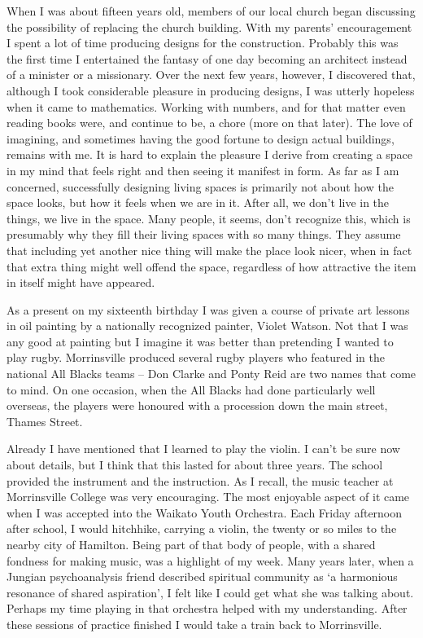 When I was about fifteen years old, members of our local church began
discussing the possibility of replacing the church building. With my
parents' encouragement I spent a lot of time producing designs for the
construction. Probably this was the first time I entertained the fantasy
of one day becoming an architect instead of a minister or a missionary.
Over the next few years, however, I discovered that, although I took
considerable pleasure in producing designs, I was utterly hopeless when
it came to mathematics. Working with numbers, and for that matter even
reading books were, and continue to be, a chore (more on that later).
The love of imagining, and sometimes having the good fortune to design
actual buildings, remains with me. It is hard to explain the pleasure I
derive from creating a space in my mind that feels right and then seeing
it manifest in form. As far as I am concerned, successfully designing
living spaces is primarily not about how the space looks, but how it
feels when we are in it. After all, we don't live in the things, we live
in the space. Many people, it seems, don't recognize this, which is
presumably why they fill their living spaces with so many things. They
assume that including yet another nice thing will make the place look
nicer, when in fact that extra thing might well offend the space,
regardless of how attractive the item in itself might have appeared.

As a present on my sixteenth birthday I was given a course of private
art lessons in oil painting by a nationally recognized painter, Violet
Watson. Not that I was any good at painting but I imagine it was better
than pretending I wanted to play rugby. Morrinsville produced several
rugby players who featured in the national All Blacks teams -- Don
Clarke and Ponty Reid are two names that come to mind. On one occasion,
when the All Blacks had done particularly well overseas, the players
were honoured with a procession down the main street, Thames Street.

Already I have mentioned that I learned to play the violin. I can't be
sure now about details, but I think that this lasted for about three
years. The school provided the instrument and the instruction. As I
recall, the music teacher at Morrinsville College was very encouraging.
The most enjoyable aspect of it came when I was accepted into the
Waikato Youth Orchestra. Each Friday afternoon after school, I would
hitchhike, carrying a violin, the twenty or so miles to the nearby city
of Hamilton. Being part of that body of people, with a shared fondness
for making music, was a highlight of my week. Many years later, when a
Jungian psychoanalysis friend described spiritual community as `a
harmonious resonance of shared aspiration', I felt like I could get what
she was talking about. Perhaps my time playing in that orchestra helped
with my understanding. After these sessions of practice finished I would
take a train back to Morrinsville.

